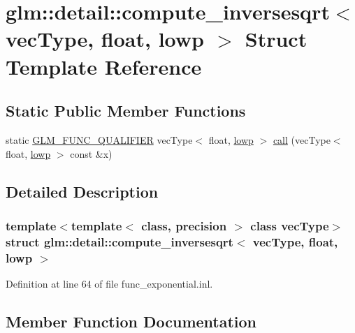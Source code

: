 \hypertarget{structglm_1_1detail_1_1compute__inversesqrt_3_01vec_type_00_01float_00_01lowp_01_4}{}\section{glm\+:\+:detail\+:\+:compute\+\_\+inversesqrt$<$ vec\+Type, float, lowp $>$ Struct Template Reference}
\label{structglm_1_1detail_1_1compute__inversesqrt_3_01vec_type_00_01float_00_01lowp_01_4}
\subsection*{Static Public Member Functions}
\begin{DoxyCompactItemize}
\item 
static \hyperlink{setup_8hpp_a33fdea6f91c5f834105f7415e2a64407}{G\+L\+M\+\_\+\+F\+U\+N\+C\+\_\+\+Q\+U\+A\+L\+I\+F\+I\+ER} vec\+Type$<$ float, \hyperlink{namespaceglm_a0f04f086094c747d227af4425893f545ae161af3fc695e696ce3bf69f7332bc2d}{lowp} $>$ \hyperlink{structglm_1_1detail_1_1compute__inversesqrt_3_01vec_type_00_01float_00_01lowp_01_4_a943fd9690f6c1fcb7383bfbcde30c3fb}{call} (vec\+Type$<$ float, \hyperlink{namespaceglm_a0f04f086094c747d227af4425893f545ae161af3fc695e696ce3bf69f7332bc2d}{lowp} $>$ const \&x)
\end{DoxyCompactItemize}


\subsection{Detailed Description}
\subsubsection*{template$<$template$<$ class, precision $>$ class vec\+Type$>$\newline
struct glm\+::detail\+::compute\+\_\+inversesqrt$<$ vec\+Type, float, lowp $>$}



Definition at line 64 of file func\+\_\+exponential.\+inl.



\subsection{Member Function Documentation}
\mbox{\label{structglm_1_1detail_1_1compute__inversesqrt_3_01vec_type_00_01float_00_01lowp_01_4_a943fd9690f6c1fcb7383bfbcde30c3fb}} 
